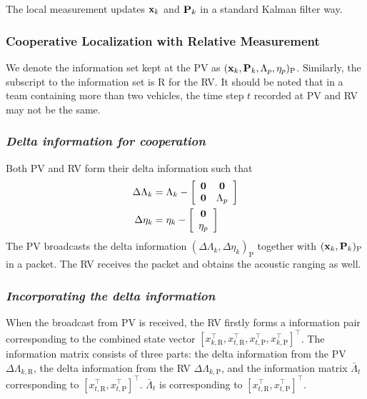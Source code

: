 The local measurement updates ${\bf x}_k$ and ${\bf{\bf P}}_k$ in a standard Kalman filter way.
\subsubsection{Cooperative Localization with Relative Measurement}
We denote the information set kept at the PV as $({\bf x}_k,{\bf{\bf P}}_k, {\Lambda}_p,{\bf\eta}_p)_{\text{P}}$. Similarly, the subscript to the information set is R for the RV. It should be noted that in a team containing more than two vehicles, the time step $t$ recorded at PV and RV may not be the same.

\subsubsection*{\textit{Delta information for cooperation}}

Both PV and RV form their delta information such that
\begin{equation}
\begin{split}
\Delta\Lambda_{k}&={\Lambda}_k-\left[
                                   \begin{array}{cc}
                                     {\bf 0} & {\bf 0} \\
                                     {\bf 0} & \Lambda_p \\
                                   \end{array}
                                 \right]
 \\
\Delta\eta_{k}&=\eta_k-\left[
                                   \begin{array}{c}
                                     {\bf 0} \\
                                     \eta_p \\
                                   \end{array}
                                 \right]
\end{split}
\end{equation}
The PV broadcasts the delta information $(\Delta\Lambda_k,\Delta\eta_k)_\text{P}$ together with $({\bf x}_k,{\bf{\bf P}}_k)_\text{P}$ in a packet. The RV receives the packet and obtains the acoustic ranging as well.

\subsubsection*{\textit{Incorporating the delta information}}
When the broadcast from PV is received, the RV firstly forms a information pair corresponding to the combined state vector $[{x}_{k,\text{R}}^\top,{x}_{t,\text{R}}^\top,{x}_{t,\text{P}}^\top,{x}_{k,\text{P}}^\top]^\top$. The information matrix consists of three parts: the delta information from the PV $\Delta\Lambda_{k,\text{R}}$, the delta information from the RV $\Delta\Lambda_{k,\text{P}}$, and the information matrix $\bar\Lambda_t$ corresponding to $[{x}_{t,\text{R}}^\top,{x}_{t,\text{P}}^\top]^\top$. $\bar\Lambda_t$ is corresponding to $[{x}_{t,\text{R}}^\top,{x}_{t,\text{P}}^\top]^\top$. %


